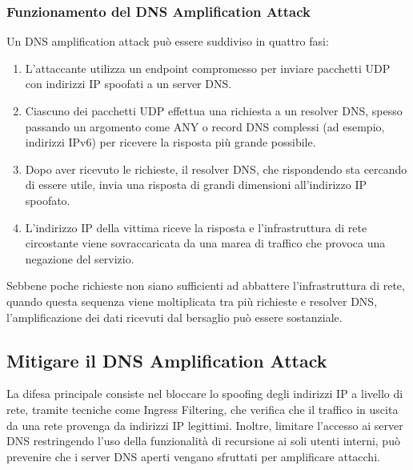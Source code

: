 \subsubsection{Funzionamento del DNS Amplification Attack}

Un DNS amplification attack può essere suddiviso in quattro fasi:

\begin{enumerate}
    \item L'attaccante utilizza un endpoint compromesso per inviare pacchetti UDP con indirizzi IP spoofati a un server DNS.
    \item Ciascuno dei pacchetti UDP effettua una richiesta a un resolver DNS, spesso passando un argomento come ANY o record DNS complessi (ad esempio, indirizzi IPv6) per ricevere la risposta più grande possibile.
    \item Dopo aver ricevuto le richieste, il resolver DNS, che rispondendo sta cercando di essere utile, invia una risposta di grandi dimensioni all'indirizzo IP spoofato.
    \item L'indirizzo IP della vittima riceve la risposta e l'infrastruttura di rete circostante viene sovraccaricata da una marea di traffico che provoca una negazione del servizio.
\end{enumerate}

Sebbene poche richieste non siano sufficienti ad abbattere l'infrastruttura di rete, quando questa sequenza viene moltiplicata tra più richieste e resolver DNS, l'amplificazione dei dati ricevuti dal bersaglio può essere sostanziale.

\subsection{Mitigare il DNS Amplification Attack}

La difesa principale consiste nel bloccare lo spoofing degli indirizzi IP a livello di rete, tramite tecniche come Ingress Filtering, che verifica che il traffico in uscita da una rete provenga da indirizzi IP legittimi. Inoltre, limitare l'accesso ai server DNS restringendo l'uso della funzionalità di recursione ai soli utenti interni, può prevenire che i server DNS aperti vengano sfruttati per amplificare attacchi.